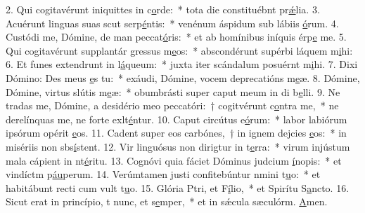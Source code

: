 2. Qui cogitavérunt iniquittes in c\uline{o}rde:~* tota die constituébnt pr\uline{ǽ}lia.
3. Acuérunt linguas suas scut serp\uline{é}ntis:~* venénum áspidum sub lábiis \uline{ó}rum.
4. Custódi me, Dómine, de man peccat\uline{ó}ris:~* et ab homínibus iníquis érp\uline{e} me.
5. Qui cogitavérunt supplantár gressus m\uline{e}os:~* abscondérunt supérbi láquem m\uline{i}hi:
6. Et funes extendrunt in l\uline{á}queum:~* juxta iter scándalum posuérnt m\uline{i}hi.
7. Dixi Dómino: Des meus \uline{e}s tu:~* exáudi, Dómine, vocem deprecatións m\uline{e}æ.
8. Dómine, Dómine, virtus slútis m\uline{e}æ:~* obumbrásti super caput meum in di b\uline{e}lli.
9. Ne tradas me, Dómine, a desidério meo peccatóri:~† cogitvérunt c\uline{o}ntra me,~* ne derelínquas me, ne forte exlt\uline{é}ntur.
10. Caput circútus e\uline{ó}rum:~* labor labiórum ipsórum opérit \uline{e}os.
11. Cadent super eos carbónes,~† in ignem dejcies \uline{e}os:~* in misériis non sbs\uline{í}stent.
12. Vir linguósus non dirigtur in t\uline{e}rra:~* virum injústum mala cápient in nt\uline{é}ritu.
13. Cognóvi quia fáciet Dóminus judcium \uline{í}nopis:~* et vindíctm p\uline{áu}perum.
14. Verúmtamen justi confitebúntur nmini t\uline{u}o:~* et habitábunt recti cum vult t\uline{u}o.
15. Glória Ptri, et F\uline{í}lio,~* et Spirítu S\uline{a}ncto.
16. Sicut erat in princípio, t nunc, et s\uline{e}mper,~* et in sǽcula sæculórm. \uline{A}men.
